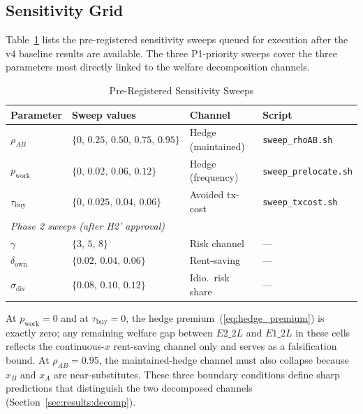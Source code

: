 \subsection{Sensitivity Grid}
\label{sec:calibration:sensitivity}

Table~\ref{tab:sensitivity_grid} lists the pre-registered sensitivity
sweeps queued for execution after the v4 baseline results are available.
The three P1-priority sweeps cover the three parameters most directly
linked to the welfare decomposition channels.

\begin{table}[t]
\centering
\caption{Pre-Registered Sensitivity Sweeps}
\label{tab:sensitivity_grid}
\small
\begin{tabular}{llll}
\toprule
Parameter & Sweep values & Channel & Script \\
\midrule
$\rho_{AB}$          & $\{0,\, 0.25,\, 0.50,\, 0.75,\, 0.95\}$  & Hedge (maintained) & \texttt{sweep\_rhoAB.sh} \\
$p_{\text{work}}$    & $\{0,\, 0.02,\, 0.06,\, 0.12\}$           & Hedge (frequency)  & \texttt{sweep\_prelocate.sh} \\
$\tau_{\text{buy}}$  & $\{0,\, 0.025,\, 0.04,\, 0.06\}$          & Avoided tx-cost    & \texttt{sweep\_txcost.sh} \\
\midrule
\multicolumn{4}{l}{\textit{Phase 2 sweeps (after H2' approval)}} \\
$\gamma$             & $\{3,\, 5,\, 8\}$                         & Risk channel       & --- \\
$\delta_{\text{own}}$& $\{0.02,\, 0.04,\, 0.06\}$               & Rent-saving        & --- \\
$\sigma_{\text{div}}$& $\{0.08,\, 0.10,\, 0.12\}$               & Idio.\ risk share  & --- \\
\bottomrule
\end{tabular}
\end{table}

At $p_{\text{work}} = 0$ and at $\tau_{\text{buy}} = 0$,
the hedge premium~(\ref{eq:hedge_premium}) is exactly zero; any
remaining welfare gap between $E2\_2L$ and $E1\_2L$ in these cells
reflects the continuous-$x$ rent-saving channel only and serves
as a falsification bound.
At $\rho_{AB} = 0.95$, the maintained-hedge channel must also collapse
because $x_B$ and $x_A$ are near-substitutes.
These three boundary conditions define sharp predictions that distinguish
the two decomposed channels (Section~\ref{sec:results:decomp}).
